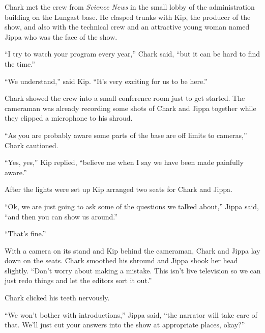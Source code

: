 


Chark met the crew from \textit{Science News} in the small lobby of the administration building
on the Lungast base. He clasped trunks with Kip, the producer of the show, and also with the
technical crew and an attractive young woman named Jippa who was the face of the show.

``I try to watch your program every year,'' Chark said, ``but it can be hard to find the time.''

``We understand,'' said Kip. ``It's very exciting for us to be here.''

Chark showed the crew into a small conference room just to get started. The cameraman was
already recording some shots of Chark and Jippa together while they clipped a microphone to his
shroud.

``As you are probably aware some parts of the base are off limits to cameras,'' Chark cautioned.

``Yes, yes,'' Kip replied, ``believe me when I say we have been made painfully aware.''

After the lights were set up Kip arranged two seats for Chark and Jippa.

``Ok, we are just going to ask some of the questions we talked about,'' Jippa said, ``and then
you can show us around.''

``That's fine.''

With a camera on its stand and Kip behind the cameraman, Chark and Jippa lay down on the seats.
Chark smoothed his shround and Jippa shook her head slightly. ``Don't worry about making a
mistake. This isn't live television so we can just redo things and let the editors sort it
out.''

Chark clicked his teeth nervously.

``We won't bother with introductions,'' Jippa said, ``the narrator will take care of that. We'll
just cut your answers into the show at appropriate places, okay?''

